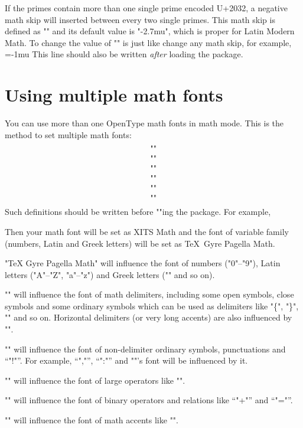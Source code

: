 If the primes contain more than one single prime encoded U+2032, 
a negative math skip will inserted between every two single primes. 
This math skip is defined as "\betweenprimeskip" and its default value 
is "-2.7mu", which is proper for Latin Modern Math. To change the value 
of "\betweenprimeskip" is just like change any math skip, for example,
\begintt
\betweenprimeskip=-1mu
\endtt
This line should also be written {\it after} loading the package.

\section{Using multiple math fonts}
You can use more than one OpenType math fonts in math mode. 
This is the method to set multiple math fonts:
$$\vbox{%
  \hbox{"\def\mathalphafontname{"\<font family name>"}"}%
  \hbox{"\def\mathdelimiterfontname{"\<font family name>"}"}%
  \hbox{"\def\mathordfontname{"\<font family name>"}"}%
  \hbox{"\def\mathopfontname{"\<font family name>"}"}%
  \hbox{"\def\mathbinfontname{"\<font family name>"}"}%
  \hbox{"\def\mathaccentfontname{"\<font family name>"}"}%
}$$
Such definitions should be written {\tenit before} ""ing the package. 
For example, 
\begintt
\def\mathfontname{XITS Math}
\def\mathalphafontname{TeX Gyre Pagella Math}

\endtt
Then your math font will be set as XITS Math and the font of variable family 
(numbers, Latin and Greek letters) will be set as \TeX\ Gyre Pagella Math.

"\mathalphafontname" will influence the font of numbers ("0"--"9"), Latin 
letters ("A"--"Z", "a"--"z") and Greek letters ("\alpha" and so on). 

"\mathdelimiterfontname" will influence the font of math delimiters, 
including some open symbols, close symbols and some ordinary symbols 
which can be used as delimiters like "\{", "\}", "\vert" and so on. 
Horizontal delimiters (or very long accents) are also influenced by 
"\mathdelimiterfontname".

"\mathordfontname" will influence the font of non-delimiter ordinary 
symbols, punctuations and ``"!"''. For example, ``","'', ``":"'' and 
"\colon"'s font will be influenced by it.

"\mathopfontname" will influence the font of large operators like "\sum".

"\mathbinfontname" will influence the font of binary operators and relations 
like ``"+"'' and ``"="''.

"\mathaccentfontname" will influence the font of math accents like "\dot".

\closeout\tocout
\bye